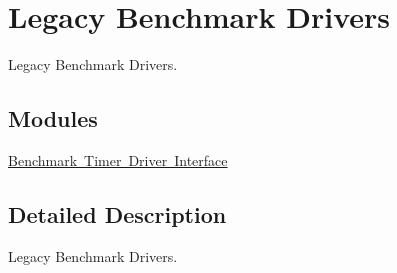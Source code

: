 \hypertarget{group__RTEMSLegacyBenchmarkDrivers}{}\section{Legacy Benchmark Drivers}
\label{group__RTEMSLegacyBenchmarkDrivers}


Legacy Benchmark Drivers.  


\subsection*{Modules}
\begin{DoxyCompactItemize}
\item 
\mbox{\hyperlink{group__BenchmarkTimer}{Benchmark Timer Driver Interface}}
\end{DoxyCompactItemize}


\subsection{Detailed Description}
Legacy Benchmark Drivers. 

